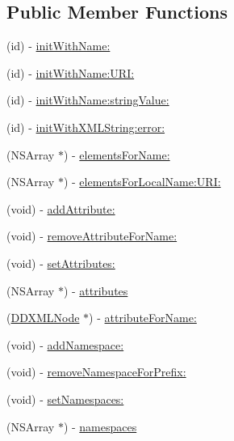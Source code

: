 \subsection*{Public Member Functions}
\begin{DoxyCompactItemize}
\item 
(id) -\/ \hyperlink{class_d_d_x_m_l_element_a7c33a6a67234196892281f15213fef04}{initWithName:}
\item 
(id) -\/ \hyperlink{class_d_d_x_m_l_element_a9b8b0cad05ffcf784d4799f6a657cca3}{initWithName:URI:}
\item 
(id) -\/ \hyperlink{class_d_d_x_m_l_element_a41737cd45eb9d25991217b46e30a0da5}{initWithName:stringValue:}
\item 
(id) -\/ \hyperlink{class_d_d_x_m_l_element_a8dd59d3ce23a8c817482358862f5c78f}{initWithXMLString:error:}
\item 
(NSArray $\ast$) -\/ \hyperlink{class_d_d_x_m_l_element_a2fbddbefc549e7846f190bb44120986f}{elementsForName:}
\item 
(NSArray $\ast$) -\/ \hyperlink{class_d_d_x_m_l_element_af696a4dbd32420584dfc06060ae9f9b8}{elementsForLocalName:URI:}
\item 
(void) -\/ \hyperlink{class_d_d_x_m_l_element_a90f579bbd747393513df84449201c85f}{addAttribute:}
\item 
(void) -\/ \hyperlink{class_d_d_x_m_l_element_ae8bb5b2fa01d039b3013afc16fe234e7}{removeAttributeForName:}
\item 
(void) -\/ \hyperlink{class_d_d_x_m_l_element_ab3c20c2f6b0dfa3f73183b53c0a325ed}{setAttributes:}
\item 
(NSArray $\ast$) -\/ \hyperlink{class_d_d_x_m_l_element_a89366024e44ca50a7a8e76a06144d2a5}{attributes}
\item 
(\hyperlink{interface_d_d_x_m_l_node}{DDXMLNode} $\ast$) -\/ \hyperlink{class_d_d_x_m_l_element_a7d5e3634f6e1cdd6a0b7d23d17c0967e}{attributeForName:}
\item 
(void) -\/ \hyperlink{class_d_d_x_m_l_element_a8945f6c9b65a5c3d76c68ab566e2bf08}{addNamespace:}
\item 
(void) -\/ \hyperlink{class_d_d_x_m_l_element_ae129e509356327ebe9b2bfa178114feb}{removeNamespaceForPrefix:}
\item 
(void) -\/ \hyperlink{class_d_d_x_m_l_element_a7e1763f7cc29c187309c7efe1a9b16a2}{setNamespaces:}
\item 
(NSArray $\ast$) -\/ \hyperlink{class_d_d_x_m_l_element_a84bb933cd340d685d22805f6dafce4b2}{namespaces}
\item 

\end{DoxyCompactItemize}
